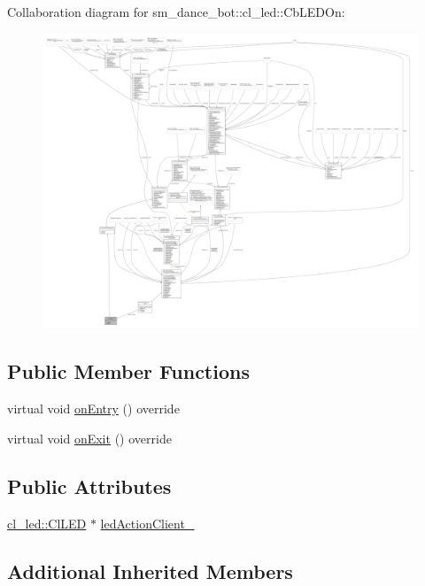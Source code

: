 Collaboration diagram for sm\+\_\+dance\+\_\+bot\+:\+:cl\+\_\+led\+:\+:Cb\+L\+E\+D\+On\+:
\nopagebreak
\begin{figure}[H]
\begin{center}
\leavevmode
\includegraphics[width=350pt]{classsm__dance__bot_1_1cl__led_1_1CbLEDOn__coll__graph}
\end{center}
\end{figure}
\subsection*{Public Member Functions}
\begin{DoxyCompactItemize}
\item 
virtual void \hyperlink{classsm__dance__bot_1_1cl__led_1_1CbLEDOn_a3b7de8585d728becefb8c2c5cc3b6d95}{on\+Entry} () override
\item 
virtual void \hyperlink{classsm__dance__bot_1_1cl__led_1_1CbLEDOn_a60a82058c585b4d0398b531c1e1bdf0b}{on\+Exit} () override
\end{DoxyCompactItemize}
\subsection*{Public Attributes}
\begin{DoxyCompactItemize}
\item 
\hyperlink{classsm__dance__bot_1_1cl__led_1_1ClLED}{cl\+\_\+led\+::\+Cl\+L\+ED} $\ast$ \hyperlink{classsm__dance__bot_1_1cl__led_1_1CbLEDOn_a1ee516ed1a051922f804818ea429f2fe}{led\+Action\+Client\+\_\+}
\end{DoxyCompactItemize}
\subsection*{Additional Inherited Members}



